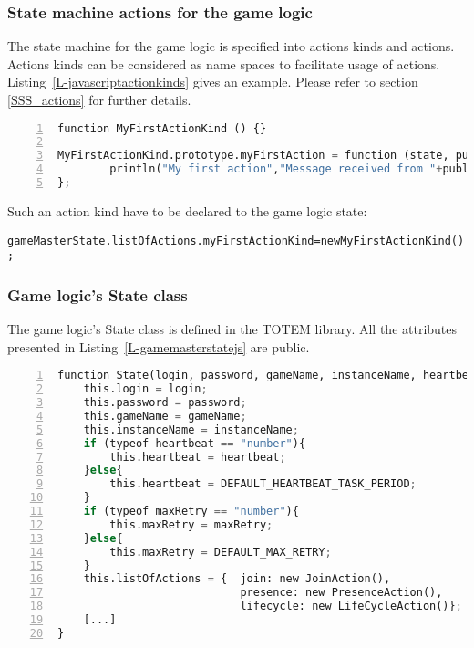 \subsubsection{State machine actions for the game logic}

The state machine for the game logic is specified into actions kinds and 
actions. Actions kinds can be considered as name spaces to facilitate usage 
of actions. Listing~\ref{L-javascriptactionkinds} gives an example. Please refer to section \ref{SSS_actions} for further details.


\begin{lstlisting}[float=htbp,frame=bt,basicstyle=\scriptsize\sffamily,numbers=left,
   numberstyle=\tiny, stepnumber=1,
    numbersep=5pt,language=python,label=L-javascriptactionkinds,caption=GameMaster's actions of the first action kinds]
function MyFirstActionKind () {}

MyFirstActionKind.prototype.myFirstAction = function (state, publisher, consumer, message){
        println("My first action","Message received from "+publisher+": "+message);
};
\end{lstlisting}

Such an action kind have to be declared to the game logic state:
\begin{small}
\begin{alltt}
gameMasterState.listOfActions.myFirstActionKind = new MyFirstActionKind();
\end{alltt}
\end{small}

\subsubsection{Game logic's State class}

The game logic's State class is defined in the TOTEM library. All the attributes presented in
Listing~\ref{L-gamemasterstatejs} are public.

\begin{lstlisting}[float=htbp,frame=bt,basicstyle=\scriptsize\sffamily,numbers=left,
   numberstyle=\tiny, stepnumber=1,
    numbersep=5pt,language=python,label=L-gamemasterstatejs,caption=GameMaster's state]
function State(login, password, gameName, instanceName, heartbeat, maxRetry){
    this.login = login;
    this.password = password;
    this.gameName = gameName;
    this.instanceName = instanceName;
    if (typeof heartbeat == "number"){
        this.heartbeat = heartbeat;
    }else{
        this.heartbeat = DEFAULT_HEARTBEAT_TASK_PERIOD;
    }
    if (typeof maxRetry == "number"){
        this.maxRetry = maxRetry;
    }else{
        this.maxRetry = DEFAULT_MAX_RETRY;
    }
    this.listOfActions = {  join: new JoinAction(),
                            presence: new PresenceAction(),
                            lifecycle: new LifeCycleAction()};
    [...]
}
\end{lstlisting}

\endinput
